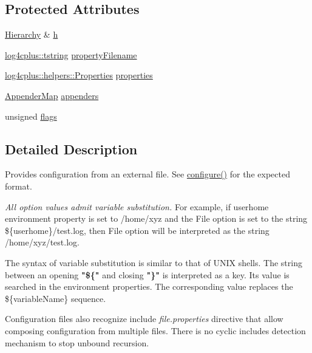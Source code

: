 \subsection*{Protected Attributes}
\begin{DoxyCompactItemize}
\item 
\hyperlink{classlog4cplus_1_1Hierarchy}{Hierarchy} \& \hyperlink{classlog4cplus_1_1PropertyConfigurator_ae80f772be9d4eb67922d34f4e2dd71d1}{h}
\item 
\hyperlink{namespacelog4cplus_a3c9287f6ebcddc50355e29d71152117b}{log4cplus\-::tstring} \hyperlink{classlog4cplus_1_1PropertyConfigurator_a0f0985dd811ee13b96068a6fc1932287}{property\-Filename}
\item 
\hyperlink{classlog4cplus_1_1helpers_1_1Properties}{log4cplus\-::helpers\-::\-Properties} \hyperlink{classlog4cplus_1_1PropertyConfigurator_a241cf28666e9c9abc2bf3784b66fb35b}{properties}
\item 
\hyperlink{classlog4cplus_1_1PropertyConfigurator_a8348301eeeee11e2c7c121f3ccb5c283}{Appender\-Map} \hyperlink{classlog4cplus_1_1PropertyConfigurator_ae25ac2e5fb71cf0dd45bcc3afe58895d}{appenders}
\item 
unsigned \hyperlink{classlog4cplus_1_1PropertyConfigurator_af813851c5e5b234239b7ea974fb8e4b2}{flags}
\end{DoxyCompactItemize}


\subsection{Detailed Description}
Provides configuration from an external file. See \hyperlink{classlog4cplus_1_1PropertyConfigurator_a21e8e6b1440cc7a8a47b8fd14c54b239}{configure()} for the expected format.

{\itshape All option values admit variable substitution.} For example, if {\ttfamily userhome} environment property is set to {\ttfamily /home/xyz} and the File option is set to the string {\ttfamily \$\{userhome\}/test.log}, then File option will be interpreted as the string {\ttfamily /home/xyz/test.log}.

The syntax of variable substitution is similar to that of U\-N\-I\-X shells. The string between an opening {\bfseries "\$\{"} and closing {\bfseries "\}"} is interpreted as a key. Its value is searched in the environment properties. The corresponding value replaces the \$\{variable\-Name\} sequence.

Configuration files also recognize {\ttfamily include {\itshape file.\-properties}} directive that allow composing configuration from multiple files. There is no cyclic includes detection mechanism to stop unbound recursion. 

